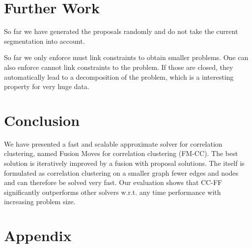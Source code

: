 \documentclass[10pt,twocolumn,letterpaper]{article}
\begin{document}
\section{Further Work}\label{sec:future}
So far we have generated the proposals randomly and do not take the current segmentation into account.

So far we only enforce must link constraints to obtain smaller problems.
One can also enforce cannot link constraints to the problem. 
If those are closed, they automatically lead to a decomposition of the problem, 
which is a interesting property for very huge data.


\section{Conclusion}\label{sec:conclusion}

We have presented a fast and scalable 
approximate solver for correlation 
clustering, named Fusion Moves for correlation clustering (FM-CC).
The best solution is iteratively improved 
by a fusion with proposal solutions.
The itself is formulated as correlation
clustering on a smaller graph fewer edges and nodes
and can therefore be solved very fast.
Our evaluation shows that CC-FF
significantly outperforms 
other solvers w.r.t. any time performance 
with increasing problem size.


    


\newpage

{\small


}

\newpage

\onecolumn
\section{Appendix}








\end{document}
